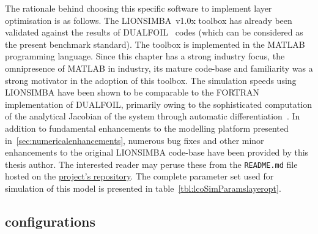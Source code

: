 The  rationale  behind  choosing  this  specific  software  to  implement  layer
optimisation  is  as  follows.  The LIONSIMBA~v1.0x  toolbox  has  already  been
validated against  the results of DUALFOIL~\cite{Dualfoil1998}  codes (which can
be considered as the present benchmark  standard). The toolbox is implemented in
the  MATLAB programming  language.  Since  this chapter  has  a strong  industry
focus,  the  omnipresence  of  MATLAB  in industry,  its  mature  code-base  and
familiarity  was  a strong  motivator  in  the  adoption  of this  toolbox.  The
simulation  speeds using  LIONSIMBA  have been  shown to  be  comparable to  the
FORTRAN  implementation  of  DUALFOIL,  primarily  owing  to  the  sophisticated
computation  of  the  analytical  Jacobian   of  the  system  through  automatic
differentiation~\cite{Torchio2016}.  In  addition  to  fundamental  enhancements
to   the  modelling   platform  presented   in~\cref{sec:numericalenhancements},
numerous  bug fixes  and  other  minor enhancements  to  the original  LIONSIMBA
code-base   have  been   provided  by   this  thesis   author.  The   interested
reader  may  peruse  these  from  the  \texttt{README.md}  file  hosted  on  the
\href{https://github.com/lionsimbatoolbox/LIONSIMBA}{project's  repository}. The
complete  parameter set  used  for  simulation of  this  model  is presented  in
table~\ref{tbl:lcoSimParamslayeropt}.



\subsection{ configurations}




